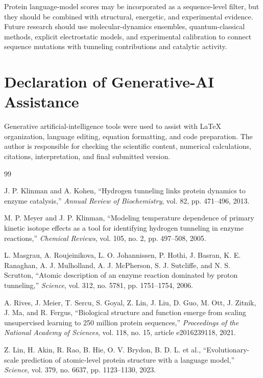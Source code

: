 \documentclass[11pt,a4paper]{article}
\begin{document}
Protein language-model scores may be incorporated as a sequence-level filter,
but they should be combined with structural, energetic, and experimental
evidence. Future research should use molecular-dynamics ensembles,
quantum-classical methods, explicit electrostatic models, and experimental
calibration to connect sequence mutations with tunneling contributions and
catalytic activity.


\section*{Declaration of Generative-AI Assistance}

Generative artificial-intelligence tools were used to assist with LaTeX
organization, language editing, equation formatting, and code preparation.
The author is responsible for checking the scientific content, numerical
calculations, citations, interpretation, and final submitted version.

\begin{thebibliography}{99}

J. P. Klinman and A. Kohen,
``Hydrogen tunneling links protein dynamics to enzyme catalysis,''
\emph{Annual Review of Biochemistry},
vol. 82, pp. 471--496, 2013.

M. P. Meyer and J. P. Klinman,
``Modeling temperature dependence of primary kinetic isotope effects as a tool
for identifying hydrogen tunneling in enzyme reactions,''
\emph{Chemical Reviews},
vol. 105, no. 2, pp. 497--508, 2005.

L. Masgrau, A. Roujeinikova, L. O. Johannissen,
P. Hothi, J. Basran, K. E. Ranaghan,
A. J. Mulholland, A. J. McPherson, S. J. Sutcliffe,
and N. S. Scrutton,
``Atomic description of an enzyme reaction dominated by proton tunneling,''
\emph{Science},
vol. 312, no. 5781, pp. 1751--1754, 2006.

A. Rives, J. Meier, T. Sercu, S. Goyal, Z. Lin,
J. Liu, D. Guo, M. Ott, J. Zitnik, J. Ma,
and R. Fergus,
``Biological structure and function emerge from scaling unsupervised learning
to 250 million protein sequences,''
\emph{Proceedings of the National Academy of Sciences},
vol. 118, no. 15, article e2016239118, 2021.

Z. Lin, H. Akin, R. Rao, B. Hie, O. V. Brydon,
B. D. L. et al.,
``Evolutionary-scale prediction of atomic-level protein structure with a
language model,''
\emph{Science},
vol. 379, no. 6637, pp. 1123--1130, 2023.

\end{thebibliography}
\end{document}
